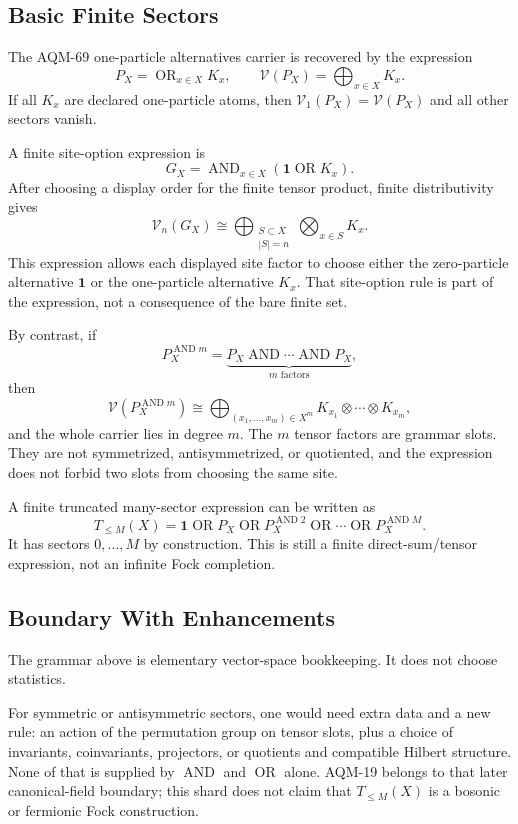 \subsection{Basic Finite Sectors}

The AQM-69 one-particle alternatives carrier is recovered by the expression
\[
  P_X=\operatorname{OR}_{x\in X} K_x,
  \qquad
  \mathcal V(P_X)=\bigoplus_{x\in X}K_x .
\]
If all \(K_x\) are declared one-particle atoms, then
\(\mathcal V_1(P_X)=\mathcal V(P_X)\) and all other sectors vanish.

A finite site-option expression is
\[
  G_X=\operatorname{AND}_{x\in X}(\mathbf 1\operatorname{OR}K_x).
\]
After choosing a display order for the finite tensor product, finite
distributivity gives
\[
  \mathcal V_n(G_X)
  \cong
  \bigoplus_{\substack{S\subset X\\ |S|=n}}
  \bigotimes_{x\in S}K_x .
\]
This expression allows each displayed site factor to choose either the
zero-particle alternative \(\mathbf 1\) or the one-particle alternative
\(K_x\).  That site-option rule is part of the expression, not a consequence
of the bare finite set.

By contrast, if
\[
  P_X^{\operatorname{AND} m}
  =
  \underbrace{P_X\operatorname{AND}\cdots\operatorname{AND}P_X}_{m
  \text{ factors}},
\]
then
\[
  \mathcal V(P_X^{\operatorname{AND} m})
  \cong
  \bigoplus_{(x_1,\ldots,x_m)\in X^m}
  K_{x_1}\otimes\cdots\otimes K_{x_m},
\]
and the whole carrier lies in degree \(m\).  The \(m\) tensor factors are
grammar slots.  They are not symmetrized, antisymmetrized, or quotiented, and
the expression does not forbid two slots from choosing the same site.

A finite truncated many-sector expression can be written as
\[
  T_{\leq M}(X)=
  \mathbf 1
  \operatorname{OR} P_X
  \operatorname{OR} P_X^{\operatorname{AND}2}
  \operatorname{OR}\cdots
  \operatorname{OR} P_X^{\operatorname{AND}M}.
\]
It has sectors \(0,\ldots,M\) by construction.  This is still a finite
direct-sum/tensor expression, not an infinite Fock completion.

\subsection{Boundary With Enhancements}

The grammar above is elementary vector-space bookkeeping.  It does not choose
statistics.

For symmetric or antisymmetric sectors, one would need extra data and a new
rule: an action of the permutation group on tensor slots, plus a choice of
invariants, coinvariants, projectors, or quotients and compatible Hilbert
structure.  None of that is supplied by \(\operatorname{AND}\) and
\(\operatorname{OR}\) alone.  AQM-19 belongs to that later canonical-field
boundary; this shard does not claim that \(T_{\leq M}(X)\) is a bosonic or
fermionic Fock construction.

